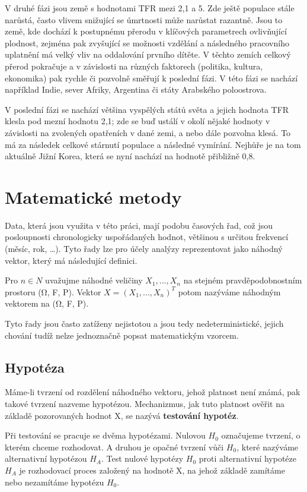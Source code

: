 \documentclass[thesis=M,czech]{FITthesis}[2022/10/08]
\begin{document}
V druhé fázi jsou země s hodnotami TFR mezi 2,1 a 5. Zde ještě populace stále narůstá, často vlivem snižující se úmrtnosti může narůstat razantně. Jsou to země, kde dochází k postupnému přerodu v klíčových parametrech ovlivňující plodnost, zejména pak zvyšující se možnosti vzdělání a následného pracovního uplatnění má velký vliv na oddalování prvního dítěte. V těchto zemích celkový přerod pokračuje a v závislosti na různých faktorech (politika, kultura, ekonomika) pak rychle či pozvolně směřují k poslední fázi. V této fázi se nachází například Indie, sever Afriky, Argentina či státy Arabského poloostrova. \cite{UN-PD}

V poslední fázi se nachází většina vyspělých států světa a jejich hodnota TFR klesla pod mezní hodnotu 2,1; zde se buď ustálí v okolí nějaké hodnoty v závislosti na zvolených opatřeních v dané zemi, a nebo dále pozvolna klesá. To má za následek celkové stárnutí populace a následné vymírání. Nejhůře je na tom aktuálně Jižní Korea, která se nyní nachází na hodnotě přibližně 0,8.

\chapter{Matematické metody}

Data, která jsou využita v této práci, mají podobu časových řad, což jsou posloupnosti chronologicky uspořádaných hodnot, většinou s určitou frekvencí (měsíc, rok, …). Tyto řady lze pro účely analýzy reprezentovat jako náhodný vektor, který má následující definici. 

Pro $n \in N$ uvažujme náhodné veličiny  $X_1, . . . , X_n$ na stejném pravděpodobnostním 
prostoru (Ω, F, P). Vektor $X = (X_1, . . . , X_n)^T$ potom nazýváme náhodným vektorem na (Ω, F, P).

Tyto řady jsou často zatíženy nejistotou a jsou tedy nedeterministické, jejich chování tudíž nelze jednoznačně popsat matematickým vzorcem. \cite{krivy}

\section{Hypotéza}
Máme-li tvrzení od rozdělení náhodného vektoru, jehož platnost není známá, pak takové tvrzení nazveme hypotézou. Mechanizmus, jak tuto platnost ověřit na základě pozorovaných hodnot X, se nazývá \textbf{testování hypotéz}.

Při testování se pracuje se dvěma hypotézami. Nulovou $H_0$ označujeme tvrzení, o kterém chceme rozhodovat. A druhou je opačné tvrzení vůči $H_0$, které nazýváme alternativní hypotézou $H_A$. Test nulové hypotézy $H_0$ proti alternativní hypotéze $H_A$ je rozhodovací proces založený na hodnotě X, na jehož základě zamítáme nebo nezamítáme hypotézu $H_0$.
\end{document}
